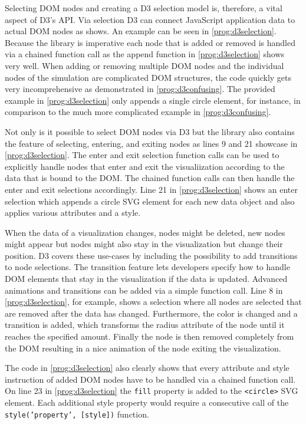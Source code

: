 Selecting DOM nodes and creating a D3 selection model is, therefore, a vital aspect of D3's API. Via selection D3 can connect JavaScript application data to actual DOM nodes as \cite[/d3-selection]{D3Github} shows. An example can be seen in \ref{prog:d3selection}. Because the library is imperative each node that is added or removed is handled via a chained function call as the append function in \ref{prog:d3selection} shows very well. When adding or removing multiple DOM nodes and the individual nodes of the simulation are complicated DOM structures, the code quickly gets very incomprehensive as demonstrated in \ref{prog:d3confusing}. The provided example in \ref{prog:d3selection} only appends a single circle element, for instance, in comparison to the much more complicated example in \ref{prog:d3confusing}. 

Not only is it possible to select DOM nodes via D3 but the library also contains the feature of selecting, entering, and exiting nodes as lines 9 and 21 showcase in \ref{prog:d3selection}. The enter and exit selection function calls can be used to explicitly handle nodes that enter and exit the visualiization according to the data that is bound to the DOM. The chained function calls can then handle the enter and exit selections accordingly. Line 21 in \ref{prog:d3selection} shows an enter selection which appends a circle SVG element for each new data object and also applies various attributes and a style.

When the data of a visualization changes, nodes might be deleted, new nodes might appear but nodes might also stay in the visualization but change their position. D3 covers these use-cases by including the possibility to add transitions to node selections. The transition feature lets developers specify how to handle DOM elements that stay in the visualization if the data is updated. Advanced animations and transitions can be added via a simple function call. Line 8 in \ref{prog:d3selection}, for example, shows a selection where all nodes are selected that are removed after the data has changed. Furthermore, the color is changed and a transition is added, which transforms the radius attribute of the node until it reaches the specified amount. Finally the node is then removed completely from the DOM resulting in a nice animation of the node exiting the visualization.

The code in \ref{prog:d3selection} also clearly shows that every attribute and style instruction of added DOM nodes have to be handled via a chained function call. On line 23 in \ref{prog:d3selection} the \texttt{fill} property is added to the \texttt{<circle>} SVG element. Each additional style property would require a consecutive call of the \texttt{style('property', [style])} function.

